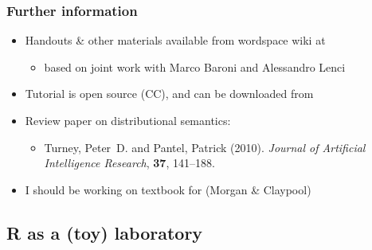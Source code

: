 \documentclass[t]{beamer} %
\begin{document}
\begin{frame}
  \frametitle{Further information}

  \begin{itemize}
  \item Handouts \& other materials available from wordspace wiki at
    \begin{center}
    \end{center}
    \begin{itemize}
    \item[\hand] based on joint work with Marco Baroni and Alessandro Lenci
    \end{itemize}
  \item Tutorial is open source (CC), and can be downloaded from
    \begin{center}\small
    \end{center}
    \gap[.5]
  \item Review paper on distributional semantics:
    \begin{itemize}
    \item[] \small\nocite{Turney:Pantel:10}
      Turney, Peter~D. and Pantel, Patrick (2010).
      {\em Journal of Artificial Intelligence Research}, {\bf 37}, 141--188.%
      \nocite{Turney:Pantel:10}
    \end{itemize}
    \gap[.5]
  \item I should be working on textbook  for  (Morgan \& Claypool)
  \end{itemize}

\end{frame}

\subsection{R as a (toy) laboratory}
\end{document}
